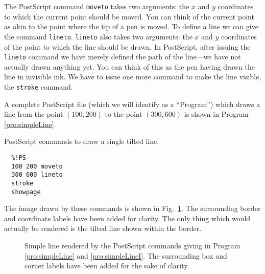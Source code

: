 The PostScript command {\tt moveto} takes two arguments: the $x$ and
$y$ coordinates to which the current point should be moved.  You can
think of the current point as akin to the point where the tip of a pen
is moved.  To define a line we can give the command {\tt lineto}.
{\tt lineto} also takes two arguments: the $x$ and $y$ coordinates of
the point to which the line should be drawn.  In PostScript,
after issuing the {\tt lineto} command we have merely defined the path
of the line---we have not actually drawn anything yet.  You can think
of this as the pen having drawn the line in invisible ink.  We have to
issue one more command to make the line visible, the {\tt stroke}
command.

A complete PostScript file (which we will identify as a ``Program'')
which draws a line from the point $(100,200)$ to the point $(300,600)$
is shown in Program \ref{pro:simpleLine}.
\begin{program}
PostScript commands to draw a single tilted line. \label{pro:simpleLine}
\codemiddle
\begin{verbatim}
  %!PS
  100 200 moveto
  300 600 lineto
  stroke
  showpage
\end{verbatim}
\end{program}
The image drawn by these commands is shown in Fig.\ \ref{fig:simpleLine}.
The surrounding border and coordinate labels have been added for
clarity.  The only thing which would actually be rendered is the
tilted line shown within the border.
\begin{figure}
  \begin{center}
  \end{center} \caption{Simple line rendered by the PostScript
  commands giving in Program \ref{pro:simpleLine} and
  \ref{pro:simpleLineI}.  The surrounding box and corner labels have
  been added for the sake of clarity.}  \label{fig:simpleLine}
\end{figure}

